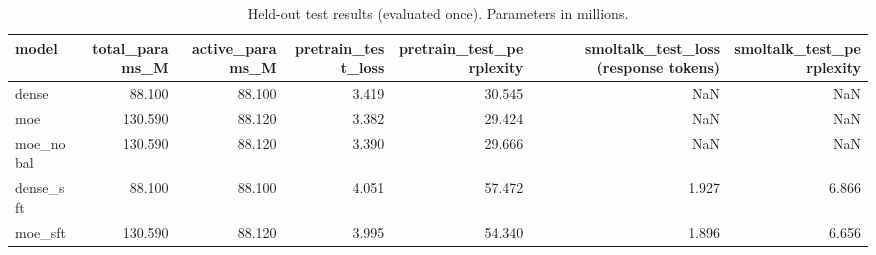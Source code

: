 \begin{table}
\caption{Held-out test results (evaluated once). Parameters in millions.}
\label{tab:models}
\begin{tabular}{lrrrrrr}
\toprule
model & total_params_M & active_params_M & pretrain_test_loss & pretrain_test_perplexity & smoltalk_test_loss (response tokens) & smoltalk_test_perplexity \\
\midrule
dense & 88.100 & 88.100 & 3.419 & 30.545 & NaN & NaN \\
moe & 130.590 & 88.120 & 3.382 & 29.424 & NaN & NaN \\
moe_nobal & 130.590 & 88.120 & 3.390 & 29.666 & NaN & NaN \\
dense_sft & 88.100 & 88.100 & 4.051 & 57.472 & 1.927 & 6.866 \\
moe_sft & 130.590 & 88.120 & 3.995 & 54.340 & 1.896 & 6.656 \\
\bottomrule
\end{tabular}
\end{table}
